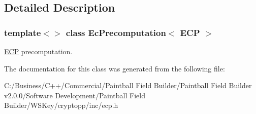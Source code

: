 \subsection{Detailed Description}
\subsubsection*{template$<$$>$ class EcPrecomputation$<$ ECP $>$}

\hyperlink{class_e_c_p}{ECP} precomputation. 

The documentation for this class was generated from the following file:\begin{DoxyCompactItemize}
\item 
C:/Business/C++/Commercial/Paintball Field Builder/Paintball Field Builder v2.0.0/Software Development/Paintball Field Builder/WSKey/cryptopp/inc/ecp.h\end{DoxyCompactItemize}
